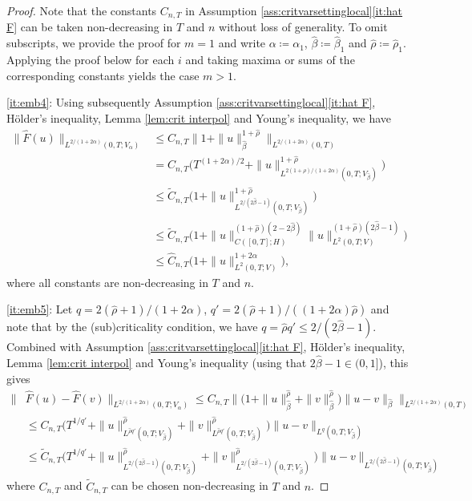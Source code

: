 \documentclass{amsart}
\newcommand{\<}{\langle}
\newcommand{\?}{\rangle}
\newcommand{\ceqq}{\coloneqq}
\theoremstyle{plain}
\theoremstyle{remark}
\theoremstyle{plain}
\numberwithin{equation}{section}
\begin{document}
\begin{proof}
Note that the constants $C_{n,T}$ in Assumption \ref{ass:critvarsettinglocal}\ref{it:hat F} can be taken non-decreasing in $T$ and $n$ without loss of generality. To omit subscripts, we provide the proof for $m=1$ and write $\alpha\ceqq \alpha_1$, $\hat{\beta}\ceqq\hat{\beta}_1$ and $\hat{\rho}\ceqq\hat{\rho}_1$. Applying the proof below for each $i$ and taking maxima or sums of the corresponding constants yields the case $m>1$. 
 
\ref{it:emb4}: Using subsequently Assumption \ref{ass:critvarsettinglocal}\ref{it:hat F}, H\"older's inequality, Lemma \ref{lem:crit interpol} and Young's inequality, we have
\begin{align*}
  \|\hat{F}(u)\|_{L^{2/(1+2\alpha)}(0,T;V_{\alpha})} 
  &\leq  C_{n,T} \big\|1+\|u\|_{\hat{\beta}}^{1+\hat{\rho}} \big\|_{L^{2/(1+2\alpha)}(0,T)} \\
   &=  {C}_{n,T}\big(T^{(1+2\alpha)/2}+\|u\|_{L^{2(1+\hat{\rho})/(1+2\alpha)}(0,T;V_{\hat{\beta}})}^{1+\hat{\rho}} \big)\\
   &\leq  \tilde{C}_{n,T}\big(1+\|u\|_{L^{2/(2\hat{\beta}-1)}(0,T;V_{\hat{\beta}})}^{1+\hat{\rho}} \big)\\
&\leq  \tilde{C}_{n,T}\big(1+\|u\|_{C([0,T];H)}^{(1+\hat{\rho})(2-2\hat{\beta})} \|u\|_{L^2(0,T;V)}^{(1+\hat{\rho})(2\hat{\beta}-1)} \big)\\
&\leq  \hat{C}_{n,T}\big(1+  \|u\|_{L^2(0,T;V)}^{1+2\alpha} \big),   
\end{align*}
where all constants are non-decreasing in $T$ and $n$. 
 
\ref{it:emb5}: 
Let $q=2(\hat{\rho}+1)/(1+2\alpha)$, $q' =2(\hat{\rho}+1)/((1+2\alpha)\hat{\rho})$ and note that by the (sub)criticality condition, we have $q=\hat{\rho}q'\leq {2}/({2\hat{\beta}-1})$. Combined with Assumption \ref{ass:critvarsettinglocal}\ref{it:hat F}, H\"older's inequality, Lemma \ref{lem:crit interpol} and Young's inequality (using that $2\hat{\beta}-1\in(0,1]$), this gives
\begin{align*}
\|&\hat{F}(u)-\hat{F}(v)\|_{L^{2/(1+2\alpha)}(0,T;V_{\alpha})}\leq C_{n,T} \big\|\big(1+\|u\|_{\hat{\beta}}^{\hat{\rho}}+\|v\|_{\hat{\beta}}^{ \hat{\rho}}\big)\|u-v\|_{\hat{\beta}} \big\|_{L^{2/(1+2\alpha)}(0,T)} \\
&\leq {C}_{n,T} \Big(T^{1/q'}+\|u\|_{L^{\hat{\rho}q'}(0,T;V_{\hat{\beta}})}^{\hat{\rho}}+\|v\|_{L^{\hat{\rho}q'}(0,T;V_{\hat{\beta}})}^{ \hat{\rho}}\Big)\|u-v\|_{L^{q}(0,T;V_{\hat{\beta}})}\\
&\leq \tilde{C}_{n,T} \Big(T^{1/q'}+\|u\|_{L^{{2}/({2\hat{\beta}-1})}(0,T;V_{\hat{\beta}})}^{\hat{\rho}}+\|v\|_{L^{{2}/({2\hat{\beta}-1})}(0,T;V_{\hat{\beta}})}^{ \hat{\rho}}\Big)\|u-v\|_{L^{{2}/({2\hat{\beta}-1})}(0,T;V_{\hat{\beta}})} 
\end{align*} 
where $C_{n,T}$ and $\tilde{C}_{n,T}$ can be chosen non-decreasing in $T$ and $n$. 


\end{proof}
\end{document}
